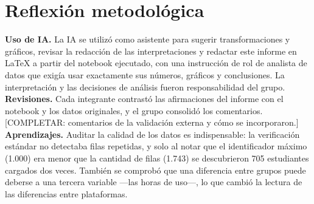 \section{Reflexión metodológica}

\textbf{Uso de IA.} La IA se utilizó como asistente para sugerir transformaciones y gráficos, revisar la
redacción de las interpretaciones y redactar este informe en \LaTeX{} a partir del notebook ejecutado, con
una instrucción de rol de analista de datos que exigía usar exactamente sus números, gráficos y conclusiones.
La interpretación y las decisiones de análisis fueron responsabilidad del grupo.
\textbf{Revisiones.} Cada integrante contrastó las afirmaciones del informe con el notebook y los datos
originales, y el grupo consolidó los comentarios. [COMPLETAR: comentarios de la validación externa y cómo se
incorporaron.]
\textbf{Aprendizajes.} Auditar la calidad de los datos es indispensable: la verificación estándar no detectaba
filas repetidas, y solo al notar que el identificador máximo (1.000) era menor que la cantidad de filas
(1.743) se descubrieron 705 estudiantes cargados dos veces. También se comprobó que una diferencia entre
grupos puede deberse a una tercera variable —las horas de uso—, lo que cambió la lectura de las diferencias
entre plataformas.
